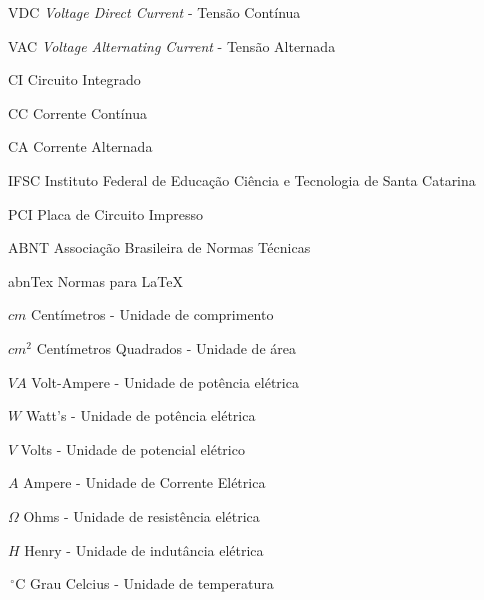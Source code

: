 \documentclass{ifscTCC} %
\begin{document}
\listoffigures*
\cleardoublepage

\listoftables*
\cleardoublepage

\begin{siglas}
   \item[VDC] \textit{Voltage Direct Current} - Tensão Contínua
   \item[VAC] \textit{Voltage Alternating Current} - Tensão Alternada
   \item[CI] Circuito Integrado
   \item[CC] Corrente Contínua
   \item[CA] Corrente Alternada
   \item[IFSC] Instituto Federal de Educação Ciência e Tecnologia de Santa Catarina
   \item[PCI] Placa de Circuito Impresso
   \item[ABNT] Associação Brasileira de Normas Técnicas
   \item[abnTex] Normas para \LaTeX
   \end{siglas}

\begin{simbolos}
   \item[$cm$] Centímetros - Unidade de comprimento
   \item[$cm^{2}$] Centímetros Quadrados - Unidade de área
   \item[$VA$] Volt-Ampere - Unidade de potência elétrica
   \item[$W$] Watt's - Unidade de potência elétrica
   \item[$V$] Volts - Unidade de potencial elétrico
 	\item[$A$] Ampere - Unidade de Corrente Elétrica
 	\item[$\Omega$] Ohms - Unidade de resistência elétrica
 	\item[$H$] Henry - Unidade de indutância elétrica
 	\item[$\,^{\circ}\mathrm{C}$] Grau Celcius - Unidade de temperatura
\end{simbolos}
\end{document}
